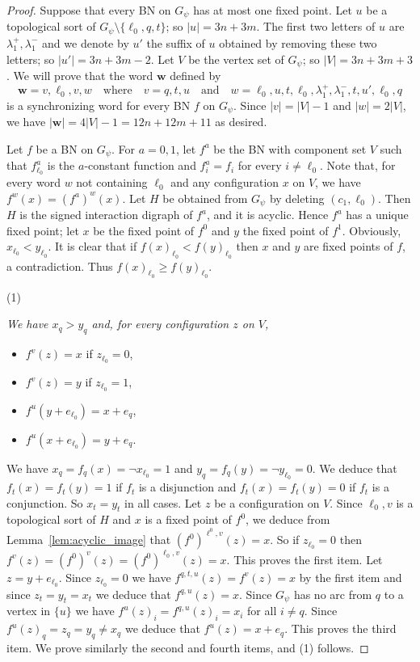 \documentclass[11pt,letter]{article}
\newcommand{\BF}[1]{{{\boldmath{\bf #1}\unboldmath}}}
\newcommand{\W}{{\mathbf{w}}}
\begin{document}
\begin{proof}
\bigskip
\noindent
\BF{($2\Rightarrow 3$)} Suppose that every BN on $G_\psi$ has at most one fixed point. Let $u$ be a topological sort of $G_\psi\setminus\{\ell_0,q,t\}$; so $|u|=3n+3m$. The first two letters of $u$ are $\lambda^+_1,\lambda^-_1$ and we denote by $u'$ the suffix of $u$ obtained by removing these two letters; so $|u'|=3n+3m-2$. Let $V$ be the vertex set of $G_\psi$; so $|V|=3n+3m+3$. We will prove that the word $\W$ defined by  
\[
\W=v,\ell_0,v,w\quad\textrm{where}\quad v=q,t,u\quad\textrm{and}\quad  w=\ell_0,u,t,\ell_0,\lambda^+_1,\lambda^-_1,t,u',\ell_0,q
\]
is a synchronizing word for every BN $f$ on $G_\psi$. Since $|v|=|V|-1$ and $|w|=2|V|$, we have $|\W|=4|V|-1=12n+12m+11$ as desired.

\medskip
Let $f$ be a BN on $G_\psi$. For $a=0,1$, let $f^a$ be the BN with component set $V$ such that $f^a_{\ell_0}$ is the $a$-constant function and $f^a_i=f_i$ for every $i\neq\ell_0$. Note that, for every word $w$ not containing $\ell_0$ and any configuration $x$ on $V$, we have $f^w(x)=(f^a)^w(x)$. Let $H$ be obtained from $G_\psi$ by deleting $(c_1,\ell_0)$.  Then $H$ is the signed interaction digraph of $f^a$, and it is acyclic. Hence $f^a$ has a unique fixed point; let $x$ be the fixed point of $f^0$ and $y$ the fixed point of $f^1$. Obviously, $x_{\ell_0}<y_{\ell_0}$. It is clear that if $f(x)_{\ell_0}<f(y)_{\ell_0}$ then $x$ and $y$ are fixed points of $f$, a contradiction. Thus $f(x)_{\ell_0}\geq f(y)_{\ell_0}$. 

\bigskip
\noindent
(1) {\em We have $x_q>y_q$ and,  for every configuration $z$ on $V$,
\begin{itemize}
\item $f^v(z)=x$ if $z_{\ell_0}=0$,
\item $f^v(z)=y$ if $z_{\ell_0}=1$,
\item $f^u(y+e_{\ell_0})=x+e_q$,
\item $f^u(x+e_{\ell_0})=y+e_q$.
\end{itemize}}

\medskip
\noindent
We have $x_q=f_q(x)=\neg x_{\ell_0}=1$ and $y_q=f_q(y)=\neg y_{\ell_0}=0$. We deduce that $f_t(x)=f_t(y)=1$ if $f_t$ is a disjunction and $f_t(x)=f_t(y)=0$ if $f_t$ is a conjunction. So $x_t=y_t$ in all cases. Let $z$ be a configuration on $V$. Since $\ell_0,v$ is a topological sort of $H$ and $x$ is a fixed point of $f^0$, we deduce from Lemma~\ref{lem:acyclic_image} that $(f^0)^{\ell^0,v}(z)=x$. So if $z_{\ell_0}=0$ then $f^v(z)=(f^0)^v(z)=(f^0)^{\ell_0,v}(z)=x$. This proves the first item. Let $z=y+e_{\ell_0}$. Since $z_{\ell_0}=0$ we have $f^{q,t,u}(z)=f^v(z)=x$ by the first item and since $z_t=y_t=x_t$ we deduce that $f^{q,u}(z)=x$. Since $G_\psi$ has no arc from $q$ to a vertex in $\{u\}$ we have $f^u(z)_i=f^{q,u}(z)_i=x_i$ for all $i\neq q$. Since $f^u(z)_q=z_q=y_q\neq x_q$ we deduce that $f^u(z)=x+e_q$. This proves the third item. We prove similarly the second and fourth items, and (1) follows.


\end{proof}
\end{document}
